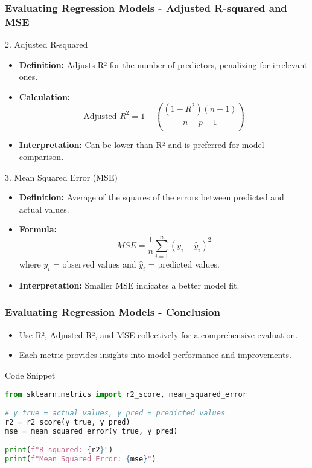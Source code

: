 \documentclass[aspectratio=169]{beamer}
\begin{document}
\begin{frame}[fragile]
    \frametitle{Evaluating Regression Models - Adjusted R-squared and MSE}
    \begin{block}{2. Adjusted R-squared}
        \begin{itemize}
            \item \textbf{Definition:} Adjusts R² for the number of predictors, penalizing for irrelevant ones.
            \item \textbf{Calculation:}
            \begin{equation}
                \text{Adjusted } R^2 = 1 - \left( \frac{(1-R^2)(n-1)}{n-p-1} \right)
            \end{equation}
            \item \textbf{Interpretation:} Can be lower than R² and is preferred for model comparison.
        \end{itemize}
    \end{block}

    \begin{block}{3. Mean Squared Error (MSE)}
        \begin{itemize}
            \item \textbf{Definition:} Average of the squares of the errors between predicted and actual values.
            \item \textbf{Formula:}
            \begin{equation}
                MSE = \frac{1}{n} \sum_{i=1}^{n} (y_i - \hat{y}_i)^2
            \end{equation}
            where \(y_i\) = observed values and \(\hat{y}_i\) = predicted values.
            \item \textbf{Interpretation:} Smaller MSE indicates a better model fit.
        \end{itemize}
    \end{block}
\end{frame}

\begin{frame}[fragile]
    \frametitle{Evaluating Regression Models - Conclusion}
    \begin{itemize}
        \item Use R², Adjusted R², and MSE collectively for a comprehensive evaluation.
        \item Each metric provides insights into model performance and improvements.
    \end{itemize}
    
    \begin{block}{Code Snippet}
    \begin{lstlisting}[language=Python]
from sklearn.metrics import r2_score, mean_squared_error

# y_true = actual values, y_pred = predicted values
r2 = r2_score(y_true, y_pred)
mse = mean_squared_error(y_true, y_pred)

print(f"R-squared: {r2}")
print(f"Mean Squared Error: {mse}")
    \end{lstlisting}
    \end{block}
\end{frame}
\end{document}
